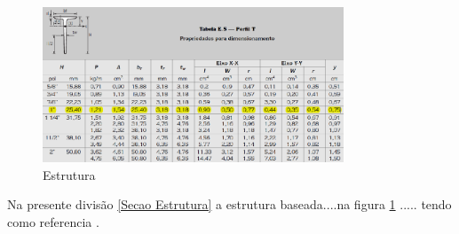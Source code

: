 \begin{figure}[h]
    \centering
    \includegraphics[width=0.8\textwidth]{figuras/perfil_t.png}
    \caption{Estrutura}
    \label{fig:awesome_image}
\end{figure}

Na presente divisão \ref{Secao Estrutura}  a estrutura baseada....na figura \ref{fig:awesome_image} ..... tendo como referencia \cite{shigley2011shigley}.

